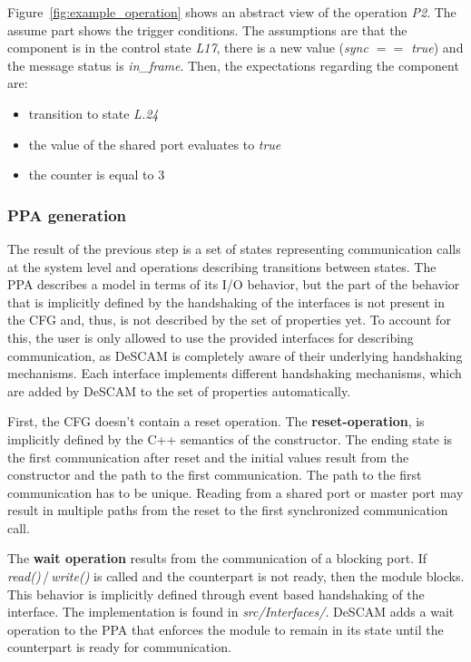 Figure~\ref{fig:example_operation} shows an abstract view of the operation \textit{P2}. 
The assume part shows the trigger conditions.
The assumptions are that the component is in the control state \textit{L17}, there is a new value (\textit{sync $==$ true}) and the message status is \textit{in\_frame}. 
Then, the expectations regarding the component are:
\begin{itemize}
\item transition to state \textit{L.24}
\item the value of the shared port evaluates to \textit{true}
\item the counter is equal to 3
\end{itemize}

\subsubsection{PPA generation}

The result of the previous step is a set of states representing communication calls at the system level and operations describing transitions between states.
The PPA describes a model in terms of its I/O behavior, but the part of the behavior that is implicitly defined by the handshaking of the interfaces is not present in the CFG and, thus, is not described by the set of properties yet. 
To account for this, the user is only allowed to use the provided interfaces for describing communication, as DeSCAM is completely aware of their underlying handshaking mechanisms.
Each interface implements different handshaking mechanisms, which are added by DeSCAM to the set of properties automatically. 

First, the CFG doesn't contain a reset operation.  
The \textbf{reset-operation}, is implicitly defined by the C++ semantics of the constructor. 
The ending state is the first communication after reset and the initial values result from the constructor and the path to the first communication.  
The path to the first communication has to be unique. 
Reading from a shared port or master port may result in multiple paths from the reset to the first synchronized communication call. 

The \textbf{wait operation} results from the communication of a blocking port. 
If \textit{read()}\,/\,\textit{write()} is called and the counterpart is not ready, then the module blocks. 
This behavior is implicitly defined through event based handshaking of the interface. 
The implementation is found in \textit{src/Interfaces/}. 
DeSCAM adds a wait operation to the PPA that enforces the module to remain in its state until the counterpart is ready for communication. 

